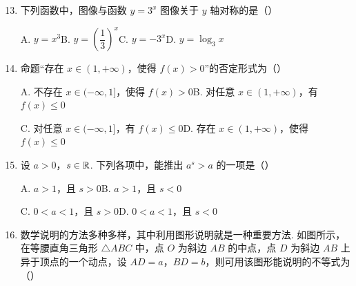 \needvspace{7cm}

\begin{enumerate}
\setcounter{enumi}{12}

\item 下列函数中，图像与函数 $y=3^x$ 图像关于 $y$ 轴对称的是\mbox{（\quad）}

\keepwithprev
A. $y=x^3$\qquad B. $y=\left(\dfrac{1}{3}\right)^x$\qquad C. $y=-3^x$\qquad D. $y=\log_3 x$

\ifanswer
\solbegin
{}
\solend
\fi

\item 命题“存在 $x\in(1,+\infty)$，使得 $f(x)>0$”的否定形式为\mbox{（\quad）}

\keepwithprev
A. 不存在 $x\in(-\infty,1]$，使得 $f(x)>0$\qquad B. 对任意 $x\in(1,+\infty)$，有 $f(x)\leqslant0$

C. 对任意 $x\in(-\infty,1]$，有 $f(x)\leqslant0$\qquad D. 存在 $x\in(1,+\infty)$，使得 $f(x)\leqslant0$

\ifanswer
\solbegin
{}
\solend
\fi

\item 设 $a>0$，$s\in\mathbb{R}$. 下列各项中，能推出 $a^s>a$ 的一项是\mbox{（\quad）}

\keepwithprev
A. $a>1$，且 $s>0$\qquad B. $a>1$，且 $s<0$

C. $0<a<1$，且 $s>0$\qquad D. $0<a<1$，且 $s<0$

\ifanswer
\solbegin
{}
\solend
\fi

\needvspace{8cm}
\item 数学说明的方法多种多样，其中利用图形说明就是一种重要方法. 如图所示，在等腰直角三角形 $\triangle ABC$ 中，点 $O$ 为斜边 $AB$ 的中点，点 $D$ 为斜边 $AB$ 上异于顶点的一个动点，设 $AD=a$，$BD=b$，则可用该图形能说明的不等式为\mbox{（\quad）}


\end{enumerate}
